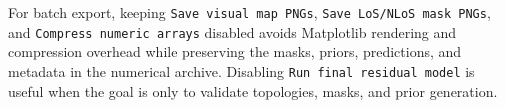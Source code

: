 For batch export, keeping \texttt{Save visual map PNGs},
\texttt{Save LoS/NLoS mask PNGs}, and \texttt{Compress numeric arrays}
disabled avoids Matplotlib rendering and compression overhead while preserving
the masks, priors, predictions, and metadata in the numerical archive.
Disabling \texttt{Run final residual model} is useful when the goal is only to
validate topologies, masks, and prior generation.

